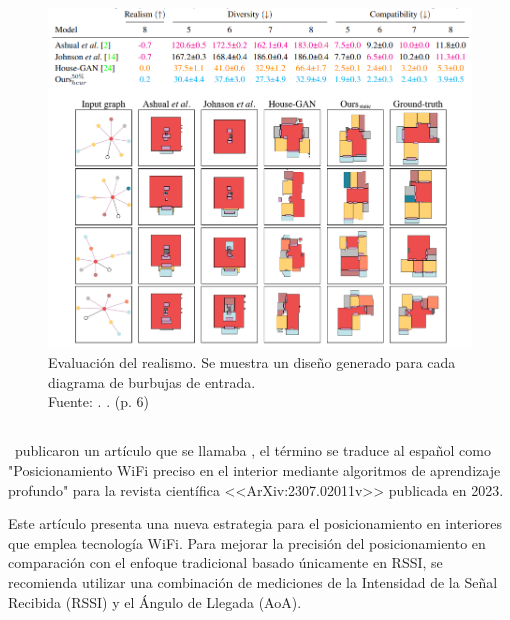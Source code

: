 \begin{figure}[!ht]
	\begin{center}
		\includegraphics[width=1.1\textwidth]{2/figures/nauata2021_2.png}
		\caption[Evaluación del realismo. Se muestra un diseño generado para cada diagrama de burbujas de entrada]{Evaluación del realismo. Se muestra un diseño generado para cada diagrama de burbujas de entrada.\\
			Fuente: \cite{pr_nauata2021housegan}. . (p. 6)}
		\label{2:fig116}
	\end{center}
\end{figure}

\subsection{}
\cite{pr_cai2023precisewifi} publicaron un artículo que se llamaba , el término se traduce al español como "Posicionamiento WiFi preciso en el interior mediante algoritmos de aprendizaje profundo" para la revista científica <<ArXiv:2307.02011v>> publicada en 2023.

Este artículo presenta una nueva estrategia para el posicionamiento en interiores que emplea tecnología WiFi. Para mejorar la precisión del posicionamiento en comparación con el enfoque tradicional basado únicamente en RSSI, se recomienda utilizar una combinación de mediciones de la Intensidad de la Señal Recibida (RSSI) y el Ángulo de Llegada (AoA).

